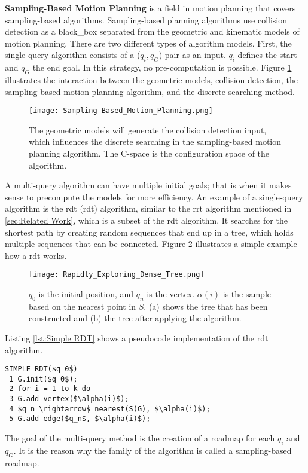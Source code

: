 \textbf{Sampling-Based Motion Planning} is a field in motion planning that covers sampling-based algorithms. Sampling-based planning algorithms use collision detection as a \Gls{black_box} separated from the geometric and kinematic models of motion planning. There are two different types of algorithm models. First, the single-query algorithm consists of a ($q_i,q_G$) pair as an input. $q_i$ defines the start and $q_G$ the end goal. In this strategy, no pre-computation is possible. Figure \ref{fig:Geometric Models Collision Detection Algorithm} illustrates the interaction between the geometric models, collision detection, the sampling-based motion planning algorithm, and the discrete searching method.
\begin{figure}[H]
    \centering
    \texttt{[image: Sampling-Based\_Motion\_Planning.png]}
    \caption{The geometric models will generate the collision detection input, which influences the discrete searching in the sampling-based motion planning algorithm. The C-space is the configuration space of the algorithm. \cite{planning_algorithms_steven_m_lavalle}}
    \label{fig:Geometric Models Collision Detection Algorithm}
\end{figure}
A multi-query algorithm can have multiple initial goals; that is when it makes sense to precompute the models for more efficiency. An example of a single-query algorithm is the \acrlong{rdt} (\acrshort{rdt}) algorithm, similar to the \acrshort{rrt} algorithm mentioned in \ref{sec:Related Work}, which is a subset of the \acrshort{rdt} algorithm. It searches for the shortest path by creating random sequences that end up in a tree, which holds multiple sequences that can be connected. Figure \ref{fig:Rapidly Exploring Dense Tree} illustrates a simple example how a \acrshort{rdt} works.
\begin{figure}[H]
    \centering
    \texttt{[image: Rapidly\_Exploring\_Dense\_Tree.png]}
    \caption{$q_0$ is the initial position, and $q_n$ is the vertex. $\alpha(i)$ is the sample based on the nearest point in $S$. (a) shows the tree that has been constructed and (b) the tree after applying the algorithm. \cite{planning_algorithms_steven_m_lavalle}}
    \label{fig:Rapidly Exploring Dense Tree}
\end{figure}

Listing \ref{lst:Simple RDT} shows a pseudocode implementation of the \acrshort{rdt} algorithm.
\begin{lstlisting}[mathescape=true, caption={The simple \acrshort{rdt} computes a random tree with the nearest function. \cite{planning_algorithms_steven_m_lavalle}}, label={lst:Simple RDT}]
SIMPLE RDT($q_0$)
 1 G.init($q_0$);
 2 for i = 1 to k do
 3 G.add vertex($\alpha(i)$);
 4 $q_n \rightarrow$ nearest(S(G), $\alpha(i)$);
 5 G.add edge($q_n$, $\alpha(i)$);
\end{lstlisting}
The goal of the multi-query method is the creation of a roadmap for each $q_i$ and $q_G$. It is the reason why the family of the algorithm is called a sampling-based roadmap. \cite{planning_algorithms_steven_m_lavalle}

